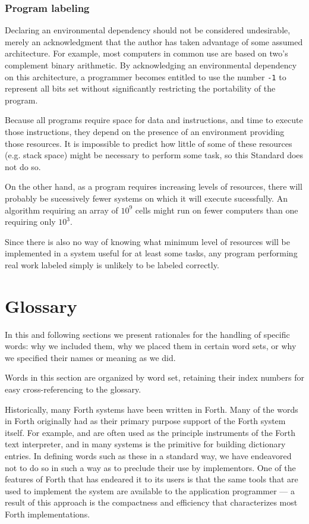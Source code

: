 \setcounter{subsubsection}{1}
\subsubsection{Program labeling} %

Declaring an environmental dependency should not be considered
undesirable, merely an acknowledgment that the author has taken
advantage of some assumed architecture. For example, most computers
in common use are based on two's complement binary arithmetic. By
acknowledging an environmental dependency on this architecture,
a programmer becomes entitled to use the number \texttt{-1} to
represent all bits set without significantly restricting the
portability of the program.

Because all programs require space for data and instructions, and
time to execute those instructions, they depend on the presence of
an environment providing those resources. It is impossible to predict
how little of some of these resources (e.g. stack space) might be
necessary to perform some task, so this Standard does not do so.

On the other hand, as a program requires increasing levels of
resources, there will probably be sucessively fewer systems on
which it will execute sucessfully. An algorithm requiring an array
of $10^9$ cells might run on fewer computers than one requiring
only $10^3$.

Since there is also no way of knowing what minimum level of resources
will be implemented in a system useful for at least some tasks, any
program performing real work labeled simply
is unlikely to be labeled correctly.


\section{Glossary} %

In this and following sections we present rationales for the handling
of specific words: why we included them, why we placed them in certain
word sets, or why we specified their names or meaning as we did.

Words in this section are organized by word set, retaining their index
numbers for easy cross-referencing to the glossary.

Historically, many Forth systems have been written in Forth. Many of
the words in Forth originally had as their primary purpose support of
the Forth system itself. For example,  and  are
often used as the principle instruments of the Forth text interpreter,
and  in many systems is the primitive for building
dictionary entries. In defining words such as these in a standard way,
we have endeavored not to do so in such a way as to preclude their use
by implementors. One of the features of Forth that has endeared it to
its users is that the same tools that are used to implement the system
are available to the application programmer --- a result of this
approach is the compactness and efficiency that characterizes most
Forth implementations.

